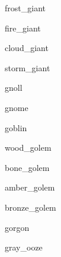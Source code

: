 \documentclass[letterpaper,serif]{module}
\begin{document}
\begin{newmonster}{frost_giant}\end{newmonster}

\begin{newmonster}{fire_giant}\end{newmonster}

\begin{newmonster}{cloud_giant}\end{newmonster}

\begin{newmonster}{storm_giant}\end{newmonster}

\begin{newmonster}{gnoll}\end{newmonster}

\begin{newmonster}{gnome}\end{newmonster}

\begin{newmonster}{goblin}\end{newmonster}


\begin{newmonster}{wood_golem}\end{newmonster}

\begin{newmonster}{bone_golem}\end{newmonster}

\begin{newmonster}{amber_golem}\end{newmonster}

\begin{newmonster}{bronze_golem}\end{newmonster}

\begin{newmonster}{gorgon}\end{newmonster}

\begin{newmonster}{gray_ooze}\end{newmonster}
\end{document}
